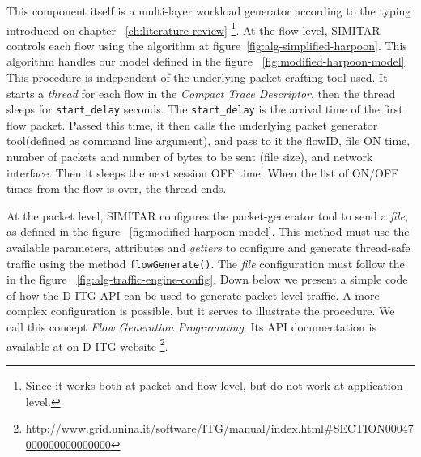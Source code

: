 This component itself is a multi-layer workload generator according to the typing introduced on chapter ~\ref{ch:literature-review} \footnote{Since it works both at packet and flow level, but do not work at application level.}. At the flow-level, SIMITAR controls each flow using the algorithm at figure~\ref{fig:alg-simplified-harpoon}. This algorithm handles our model defined in the figure ~\ref{fig:modified-harpoon-model}. This procedure is independent of the underlying packet crafting tool used. It starts a \textit{thread} for each flow in the \textit{Compact Trace Descriptor}, then the thread sleeps for \texttt{start\_delay} seconds. The \texttt{start\_delay} is the arrival time of the first flow packet. Passed this time, it then calls the underlying packet generator tool(defined as command line argument), and pass to it the flowID, file ON time, number of packets and number of bytes to be sent (file size), and network interface. Then it sleeps the next session OFF time. When the list of ON/OFF times from the flow is over, the thread ends. 


At the packet level, SIMITAR configures the packet-generator tool to send a \textit{file}, as defined in the figure ~\ref{fig:modified-harpoon-model}. This method must use the available parameters, attributes and \textit{getters} to configure and generate thread-safe traffic using the method \texttt{flowGenerate()}. The \textit{file} configuration must follow the in the figure ~\ref{fig:alg-traffic-engine-config}.  Down below we present a simple code of how the D-ITG API can be used to generate packet-level traffic. A more complex configuration is possible, but it serves to illustrate the procedure. We call this concept \textit{Flow Generation Programming}.  Its API documentation is available at on D-ITG website \footnote{\href{http://www.grid.unina.it/software/ITG/manual/index.html\#SECTION00047000000000000000}{http://www.grid.unina.it/software/ITG/manual/index.html\#SECTION00047000000000000000}}. 


